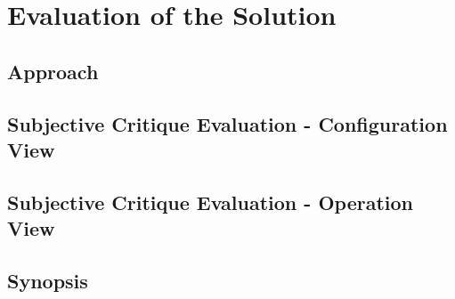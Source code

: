 
\chapter{Evaluation of the Solution} %

\label{chap:Chapter8} %


\section{Approach}

\section{Subjective Critique Evaluation - Configuration View}

\section{Subjective Critique Evaluation - Operation View}

\section{Synopsis}